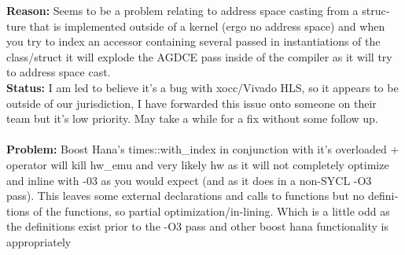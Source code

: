 \begin{otherlanguage}{english}
                                         \textbf{Reason:} Seems to be a problem
                                         relating to address space casting from
                                         a structure that is implemented outside
                                         of a kernel (ergo no address space) and
                                         when you try to index an accessor
                                         containing several passed in
                                         instantiations of the class/struct it
                                         will explode the AGDCE pass inside of
                                         the compiler as it will try to address
                                         space cast.
                                         \\
                                         \textbf{Status:} I am led to believe
                                         it's a bug with xocc/Vivado HLS, so it
                                         appears to be outside of our
                                         jurisdiction, I have forwarded this
                                         issue onto someone on their team but
                                         it's low priority. May take a while for
                                         a fix without some follow up.
                                         \\
                                         \\
                                         \textbf{Problem:} Boost Hana's
                                         times::with\_index in conjunction with
                                         it's overloaded + operator will kill
                                         hw\_emu and very likely hw as it will
                                         not completely optimize and inline with
                                         -03 as you would expect (and as it does
                                         in a non-SYCL -O3 pass). This leaves
                                         some external declarations and calls to
                                         functions but no definitions of the
                                         functions, so partial
                                         optimization/in-lining. Which is a
                                         little odd as the definitions exist
                                         prior to the -O3 pass and other boost
                                         hana functionality is appropriately

\end{otherlanguage}
